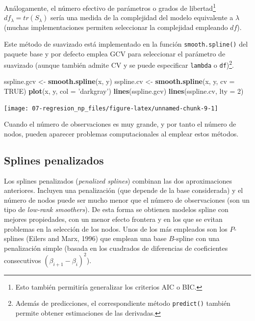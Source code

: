 \documentclass[
]{book}
\newenvironment{Shaded}{\begin{snugshade}}{\end{snugshade}}
\newcommand{\DataTypeTok}[1]{\textcolor[rgb]{0.13,0.29,0.53}{#1}}
\newcommand{\DecValTok}[1]{\textcolor[rgb]{0.00,0.00,0.81}{#1}}
\newcommand{\KeywordTok}[1]{\textcolor[rgb]{0.13,0.29,0.53}{\textbf{#1}}}
\newcommand{\NormalTok}[1]{#1}
\newcommand{\OtherTok}[1]{\textcolor[rgb]{0.56,0.35,0.01}{#1}}
\newcommand{\StringTok}[1]{\textcolor[rgb]{0.31,0.60,0.02}{#1}}
\theoremstyle{break}
\theoremstyle{definition}
\theoremstyle{definition}
\theoremstyle{definition}
\theoremstyle{remark}
\begin{document}
Análogamente, el número efectivo de parámetros o grados de libertad\footnote{Esto también permitiría generalizar los criterios AIC o BIC.} \(df_{\lambda}=tr(S_{\lambda})\) sería una medida de la complejidad del modelo equivalente a \(\lambda\) (muchas implementaciones permiten seleccionar la complejidad empleando \(df\)).

Este método de suavizado está implementado en la función \texttt{smooth.spline()} del paquete base y por defecto emplea GCV para seleccionar el parámetro de suavizado (aunque también admite CV y se puede especificar \texttt{lambda} o \texttt{df})\footnote{Además de predicciones, el correspondiente método \texttt{predict()} también permite obtener estimaciones de las derivadas.}.

\begin{Shaded}
\begin{Highlighting}[]
\NormalTok{sspline.gcv <-}\StringTok{ }\KeywordTok{smooth.spline}\NormalTok{(x, y)}
\NormalTok{sspline.cv <-}\StringTok{ }\KeywordTok{smooth.spline}\NormalTok{(x, y, }\DataTypeTok{cv =} \OtherTok{TRUE}\NormalTok{)}
\KeywordTok{plot}\NormalTok{(x, y, }\DataTypeTok{col =} \StringTok{'darkgray'}\NormalTok{)}
\KeywordTok{lines}\NormalTok{(sspline.gcv)}
\KeywordTok{lines}\NormalTok{(sspline.cv, }\DataTypeTok{lty =} \DecValTok{2}\NormalTok{)}
\end{Highlighting}
\end{Shaded}

\begin{center}\texttt{[image: 07-regresion\_np\_files/figure-latex/unnamed-chunk-9-1]} \end{center}

Cuando el número de observaciones es muy grande, y por tanto el número de nodos, pueden aparecer problemas computacionales al emplear estos métodos.

\hypertarget{splines-penalizados}{%
\subsection{Splines penalizados}\label{splines-penalizados}}

Los splines penalizados (\emph{penalized splines}) combinan las dos aproximaciones anteriores.
Incluyen una penalización (que depende de la base considerada) y el número de nodos puede ser mucho menor que el número de observaciones (son un tipo de \emph{low-rank smoothers}). De esta forma se obtienen modelos spline con mejores propiedades, con un menor efecto frontera y en los que se evitan problemas en la selección de los nodos.
Unos de los más empleados son los \(P\)-splines (Eilers and Marx, 1996) que emplean una base \(B\)-spline con una penalización simple (basada en los cuadrados de diferencias de coeficientes consecutivos \((\beta_{i+1} - \beta_i)^2\)).
\end{document}
